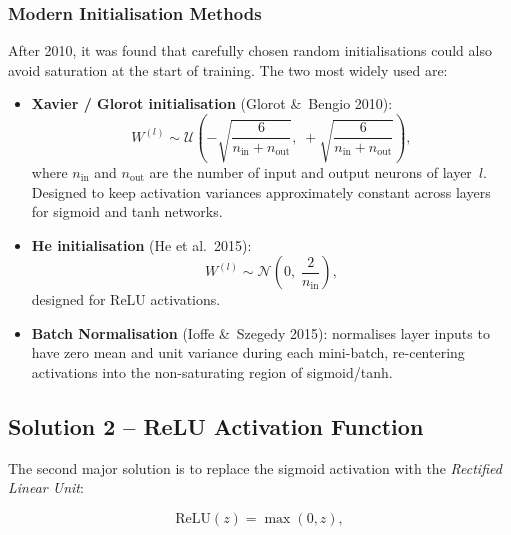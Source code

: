 \documentclass[12pt,a4paper]{article}
\newcommand{\relu}{\mathrm{ReLU}}
\begin{document}
\subsubsection{Modern Initialisation Methods}
\label{subsubsec:modern_init}

After 2010, it was found that carefully chosen random initialisations
could also avoid saturation at the start of training.  The two most
widely used are:

\begin{itemize}
  \item \textbf{Xavier / Glorot initialisation} (Glorot \&\ Bengio 2010):
        \begin{equation}
          W^{(l)} \sim \mathcal{U}\!\left(
            -\sqrt{\frac{6}{n_{\mathrm{in}}+n_{\mathrm{out}}}},\;
            +\sqrt{\frac{6}{n_{\mathrm{in}}+n_{\mathrm{out}}}}
          \right),
          \label{eq:xavier_init}
        \end{equation}
        where $n_{\mathrm{in}}$ and $n_{\mathrm{out}}$ are the number
        of input and output neurons of layer~$l$.  Designed to keep
        activation variances approximately constant across layers for
        sigmoid and tanh networks.

  \item \textbf{He initialisation} (He et al.\ 2015):
        \begin{equation}
          W^{(l)} \sim \mathcal{N}\!\left(
            0,\; \frac{2}{n_{\mathrm{in}}}
          \right),
          \label{eq:he_init}
        \end{equation}
        designed for ReLU activations.

  \item \textbf{Batch Normalisation} (Ioffe \&\ Szegedy 2015):
        normalises layer inputs to have zero mean and unit variance
        during each mini-batch, re-centering activations into the
        non-saturating region of sigmoid/tanh.
\end{itemize}

\subsection{Solution 2 -- ReLU Activation Function}
\label{subsec:relu}

The second major solution is to replace the sigmoid activation with
the \emph{Rectified Linear Unit}:

\begin{equation}
  \relu(z) = \max(0, z),
  \label{eq:relu_def}
\end{equation}
\end{document}

